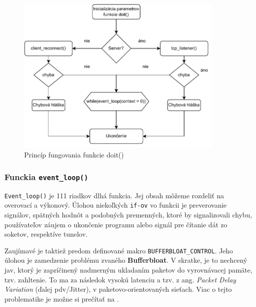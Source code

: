 \begin{figure}[!h]
	\centering
	\includegraphics[width=0.9\textwidth]{figures/fc2}
	\caption{Princíp fungovania funkcie doit()}
	\label{fc2}
\end{figure}

\subsubsection{Funckia \lstinline|event_loop()|}
\lstinline|Event_loop()| je 111 riadkov dlhá funkcia. Jej obsah môžeme rozdeliť na overovací a výkonový. Úlohou niekoľkých \lstinline|if-ov| vo funkcii je preverovanie signálov, spätných hodnôt a podobných premenných, ktoré by signalizovali chybu, používateľov záujem o ukončenie programu alebo signál pre čítanie dát zo soketov, respektíve tunelov. 
 
Zaujímavé je taktiež predom definované makro \lstinline|BUFFERBLOAT_CONTROL|. Jeho úlohou je zamedzenie problému zvaného \textbf{Bufferbloat}. V skratke, je to nechcený jav, ktorý je zapríčinený nadmerným ukladaním paketov do vyrovnávacej pamäte, tzv. zahltenie. To ma za následok vysokú latenciu a tzv. z ang. \textit{Packet Delay Variation} (ďalej \acrshort{pdv}/Jitter), v paketovo-orientovaných sieťach. Viac o tejto problematike je možne si prečítať na \cite{bufferbloat}.
 
